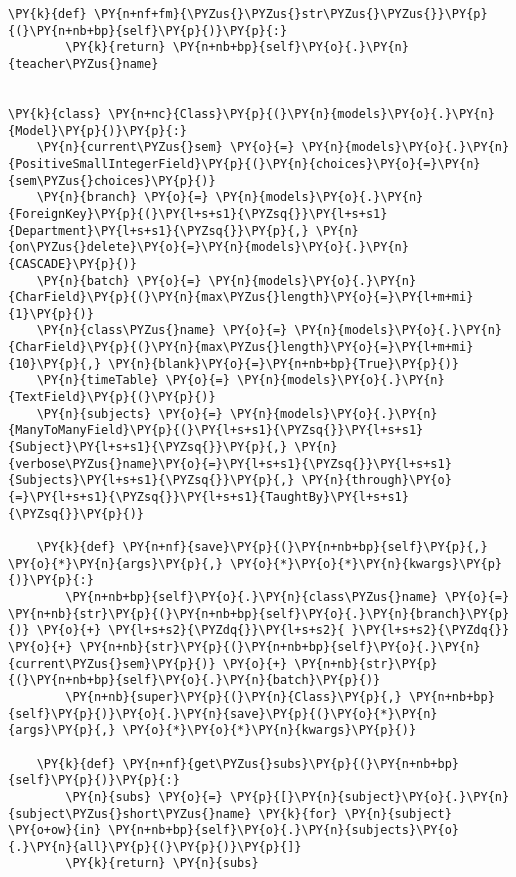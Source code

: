 \begin{Verbatim}[commandchars=\\\{\}]
    \PY{k}{def} \PY{n+nf+fm}{\PYZus{}\PYZus{}str\PYZus{}\PYZus{}}\PY{p}{(}\PY{n+nb+bp}{self}\PY{p}{)}\PY{p}{:}
        \PY{k}{return} \PY{n+nb+bp}{self}\PY{o}{.}\PY{n}{teacher\PYZus{}name}


\PY{k}{class} \PY{n+nc}{Class}\PY{p}{(}\PY{n}{models}\PY{o}{.}\PY{n}{Model}\PY{p}{)}\PY{p}{:}
    \PY{n}{current\PYZus{}sem} \PY{o}{=} \PY{n}{models}\PY{o}{.}\PY{n}{PositiveSmallIntegerField}\PY{p}{(}\PY{n}{choices}\PY{o}{=}\PY{n}{sem\PYZus{}choices}\PY{p}{)}
    \PY{n}{branch} \PY{o}{=} \PY{n}{models}\PY{o}{.}\PY{n}{ForeignKey}\PY{p}{(}\PY{l+s+s1}{\PYZsq{}}\PY{l+s+s1}{Department}\PY{l+s+s1}{\PYZsq{}}\PY{p}{,} \PY{n}{on\PYZus{}delete}\PY{o}{=}\PY{n}{models}\PY{o}{.}\PY{n}{CASCADE}\PY{p}{)}
    \PY{n}{batch} \PY{o}{=} \PY{n}{models}\PY{o}{.}\PY{n}{CharField}\PY{p}{(}\PY{n}{max\PYZus{}length}\PY{o}{=}\PY{l+m+mi}{1}\PY{p}{)}
    \PY{n}{class\PYZus{}name} \PY{o}{=} \PY{n}{models}\PY{o}{.}\PY{n}{CharField}\PY{p}{(}\PY{n}{max\PYZus{}length}\PY{o}{=}\PY{l+m+mi}{10}\PY{p}{,} \PY{n}{blank}\PY{o}{=}\PY{n+nb+bp}{True}\PY{p}{)}
    \PY{n}{timeTable} \PY{o}{=} \PY{n}{models}\PY{o}{.}\PY{n}{TextField}\PY{p}{(}\PY{p}{)}
    \PY{n}{subjects} \PY{o}{=} \PY{n}{models}\PY{o}{.}\PY{n}{ManyToManyField}\PY{p}{(}\PY{l+s+s1}{\PYZsq{}}\PY{l+s+s1}{Subject}\PY{l+s+s1}{\PYZsq{}}\PY{p}{,} \PY{n}{verbose\PYZus{}name}\PY{o}{=}\PY{l+s+s1}{\PYZsq{}}\PY{l+s+s1}{Subjects}\PY{l+s+s1}{\PYZsq{}}\PY{p}{,} \PY{n}{through}\PY{o}{=}\PY{l+s+s1}{\PYZsq{}}\PY{l+s+s1}{TaughtBy}\PY{l+s+s1}{\PYZsq{}}\PY{p}{)}

    \PY{k}{def} \PY{n+nf}{save}\PY{p}{(}\PY{n+nb+bp}{self}\PY{p}{,} \PY{o}{*}\PY{n}{args}\PY{p}{,} \PY{o}{*}\PY{o}{*}\PY{n}{kwargs}\PY{p}{)}\PY{p}{:}
        \PY{n+nb+bp}{self}\PY{o}{.}\PY{n}{class\PYZus{}name} \PY{o}{=} \PY{n+nb}{str}\PY{p}{(}\PY{n+nb+bp}{self}\PY{o}{.}\PY{n}{branch}\PY{p}{)} \PY{o}{+} \PY{l+s+s2}{\PYZdq{}}\PY{l+s+s2}{ }\PY{l+s+s2}{\PYZdq{}} \PY{o}{+} \PY{n+nb}{str}\PY{p}{(}\PY{n+nb+bp}{self}\PY{o}{.}\PY{n}{current\PYZus{}sem}\PY{p}{)} \PY{o}{+} \PY{n+nb}{str}\PY{p}{(}\PY{n+nb+bp}{self}\PY{o}{.}\PY{n}{batch}\PY{p}{)}
        \PY{n+nb}{super}\PY{p}{(}\PY{n}{Class}\PY{p}{,} \PY{n+nb+bp}{self}\PY{p}{)}\PY{o}{.}\PY{n}{save}\PY{p}{(}\PY{o}{*}\PY{n}{args}\PY{p}{,} \PY{o}{*}\PY{o}{*}\PY{n}{kwargs}\PY{p}{)}

    \PY{k}{def} \PY{n+nf}{get\PYZus{}subs}\PY{p}{(}\PY{n+nb+bp}{self}\PY{p}{)}\PY{p}{:}
        \PY{n}{subs} \PY{o}{=} \PY{p}{[}\PY{n}{subject}\PY{o}{.}\PY{n}{subject\PYZus{}short\PYZus{}name} \PY{k}{for} \PY{n}{subject} \PY{o+ow}{in} \PY{n+nb+bp}{self}\PY{o}{.}\PY{n}{subjects}\PY{o}{.}\PY{n}{all}\PY{p}{(}\PY{p}{)}\PY{p}{]}
        \PY{k}{return} \PY{n}{subs}


\end{Verbatim}
